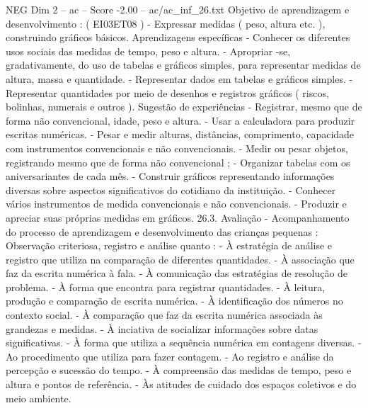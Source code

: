 \begin{textsample}{NEG Dim 2 – ac – Score -2.00 – ac/ac\_inf\_26.txt}
Objetivo de aprendizagem e desenvolvimento : ( EI03ET08 ) - Expressar medidas ( peso, altura etc. ), construindo gráficos básicos.
Aprendizagens específicas - Conhecer os diferentes usos sociais das medidas de tempo, peso e altura. - Apropriar -se, gradativamente, do uso de tabelas e gráficos simples, para representar medidas de altura, massa e quantidade. - Representar dados em tabelas e gráficos simples. - Representar quantidades por meio de desenhos e registros gráficos ( riscos, bolinhas, numerais e outros ).
Sugestão de experiências - Registrar, mesmo que de forma não convencional, idade, peso e altura. - Usar a calculadora para produzir escritas numéricas. - Pesar e medir alturas, distâncias, comprimento, capacidade com instrumentos convencionais e não convencionais. - Medir ou pesar objetos, registrando mesmo que de forma não convencional ; - Organizar tabelas com os aniversariantes de cada mês. - Construir gráficos representando informações diversas sobre aspectos significativos do cotidiano da instituição. - Conhecer vários instrumentos de medida convencionais e não convencionais. - Produzir e apreciar suas próprias medidas em gráficos. 26.3.
Avaliação - Acompanhamento do processo de aprendizagem e desenvolvimento das crianças pequenas : Observação criteriosa, registro e análise quanto : - À estratégia de análise e registro que utiliza na comparação de diferentes quantidades. - À associação que faz da escrita numérica à fala. - À comunicação das estratégias de resolução de problema. - À forma que encontra para registrar quantidades. - À leitura, produção e comparação de escrita numérica. - À identificação dos números no contexto social. - À comparação que faz da escrita numérica associada às grandezas e medidas. - À inciativa de socializar informações sobre datas significativas. - À forma que utiliza a sequência numérica em contagens diversas. - Ao procedimento que utiliza para fazer contagem. - Ao registro e análise da percepção e sucessão do tempo. - À compreensão das medidas de tempo, peso e altura e pontos de referência. - Às atitudes de cuidado dos espaços coletivos e do meio ambiente.

\end{textsample}
